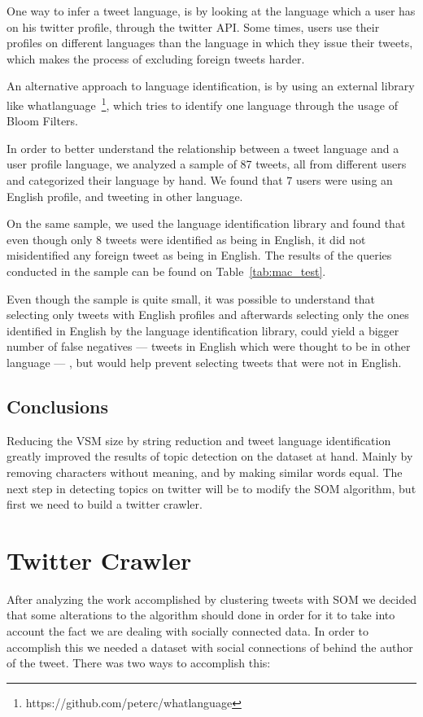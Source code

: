 One way to infer a tweet language, is by looking at the language which a user has on his twitter profile, through the twitter API. Some times, users use their profiles on different languages than the language in which they issue their tweets, which makes the process of excluding foreign tweets harder.

An alternative approach to language identification, is by using an external library like whatlanguage~\footnote{https://github.com/peterc/whatlanguage}, which tries to identify one language through the usage of Bloom Filters.  

In order to better understand the relationship between a tweet language and a user profile language, we analyzed a sample of 87 tweets, all from different users and categorized their language by hand. We found that 7 users were using an English profile, and tweeting in other language.

On the same sample, we used the language identification library and found that even though only 8 tweets were identified as being in English, it did not misidentified any foreign tweet as being in English. The results of the queries conducted in the sample can be found on Table~\ref{tab:mac_test}.  



Even though the sample is quite small, it was possible to understand that selecting only tweets with English profiles and afterwards selecting only the ones identified in English by the language identification library, could yield a bigger number of false negatives --- tweets in English which were thought to be in other language ---  , but would help prevent selecting tweets that were not in English.

\subsection{Conclusions}
\label{sub:conclusions}
Reducing the \ac{VSM} size by string reduction and tweet language identification greatly improved the results of topic detection on the dataset at hand. Mainly by removing characters without meaning, and by making similar words equal. The next step in detecting topics on twitter will be to modify the \ac{SOM} algorithm, but first we need to build a twitter crawler. 

\section{Twitter Crawler}
\label{sec:twitter_crawler}
After analyzing the work accomplished by clustering tweets with \ac{SOM} we decided that some alterations to the algorithm should done in order for it to take into account the fact we are dealing with socially connected data. In order to accomplish this we needed a dataset with social connections of behind the author of the tweet. There was two ways to accomplish this: 

